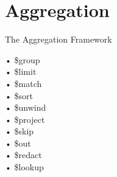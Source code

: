 \documentclass{beamer}
\begin{document}
\section{Aggregation}
\begin{frame}{The Aggregation Framework}

\begin{minipage}[t]{0.3\textwidth}
	\begin{Alms*}
	• \$group \\
	• \$limit \\
	• \$match \\
	• \$sort \\
	• \$unwind \\
	• \$project \\
	• \$skip \\
	• \$out \\
	• \$redact \\
	• \$lookup \\
	\end{Alms*}
\end{minipage}
\hfill
\begin{minipage}[t]{0.7\textwidth}
    \begin{figure}
        \centering

\end{figure}
\end{minipage}
\end{frame}
\end{document}
